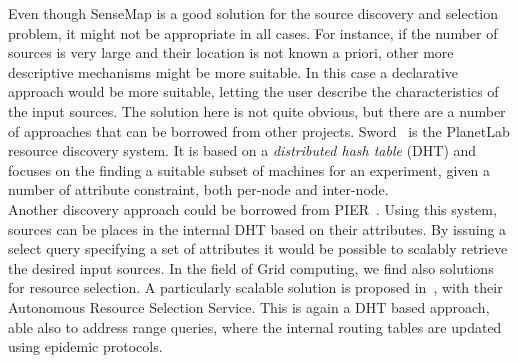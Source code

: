 Even though SenseMap is a good solution for the source discovery and selection problem, it might not be appropriate in
all cases. For instance, if the number of sources is very large and their location is not known a priori, other more
descriptive mechanisms might be more suitable. In this case a declarative approach would be more suitable, letting the
user describe the characteristics of the input sources. The solution here is not quite obvious, but there are a number of
approaches that can be borrowed from other projects. Sword~\cite{sword} is the PlanetLab resource discovery system. It is
based on a \emph{distributed hash table} (DHT) and focuses on the finding a suitable subset of machines for an experiment, given a number of attribute constraint, both
per-node and inter-node. \\
Another discovery approach could be borrowed from PIER~\cite{pier1, pier2}. Using this system, sources can be places in the internal DHT based on their attributes.
By issuing a select query specifying a set of attributes it would be possible to scalably retrieve the desired input
sources. In the field of Grid computing, we find also solutions for resource selection. A particularly scalable
solution is proposed in~\cite{rss-costa}, with their Autonomous Resource Selection Service. This is again a DHT based
approach, able also to address range queries, where the internal routing tables are updated using epidemic protocols. 


